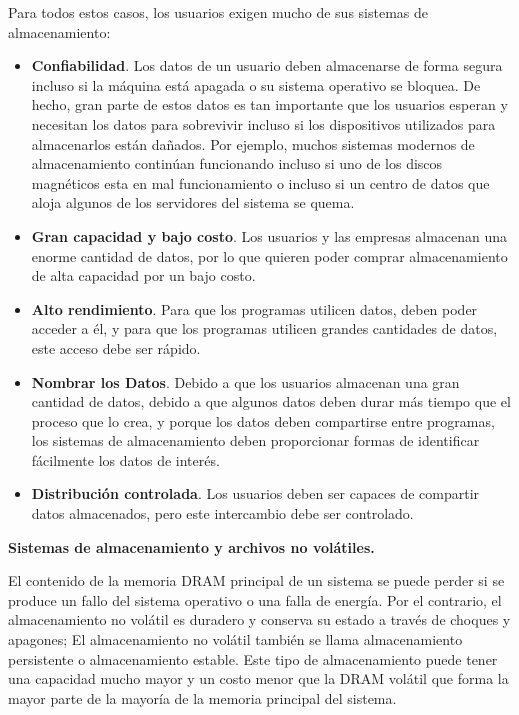 \documentclass[10pt]{book}
\begin{document}
Para todos estos casos, los usuarios exigen mucho de sus sistemas de almacenamiento:
\begin{itemize}
\item \textbf{Confiabilidad}. Los datos de un usuario deben almacenarse de forma segura incluso si la máquina está apagada o su sistema operativo se bloquea. De hecho, gran parte de estos datos es tan importante que los usuarios esperan y necesitan los datos para sobrevivir incluso si los dispositivos utilizados para almacenarlos están dañados. Por ejemplo, muchos sistemas modernos de almacenamiento continúan funcionando incluso si uno de los discos magnéticos esta en mal funcionamiento o incluso si un centro de datos que aloja algunos de los servidores del sistema se quema.

\item \textbf{Gran capacidad y bajo costo}. Los usuarios y las empresas almacenan una enorme cantidad de datos, por lo que quieren poder comprar almacenamiento de alta capacidad por un bajo costo.

\item \textbf{Alto rendimiento}. Para que los programas utilicen datos, deben poder acceder a él, y para que los programas utilicen grandes cantidades de datos, este acceso debe ser rápido.

\item \textbf{Nombrar los Datos}. Debido a que los usuarios almacenan una gran cantidad de datos, debido a que algunos datos deben durar más tiempo que el proceso que lo crea, y porque los datos deben compartirse entre programas, los sistemas de almacenamiento deben proporcionar formas de identificar fácilmente los datos de interés.

\item \textbf{Distribución controlada}. Los usuarios deben ser capaces de compartir datos almacenados, pero este intercambio debe ser controlado.
\end{itemize}

\textbf{Sistemas de almacenamiento y archivos no volátiles.}

El contenido de la memoria DRAM principal de un sistema se puede perder si se produce un fallo del sistema operativo o una falla de energía. Por el contrario, el almacenamiento no volátil es duradero y conserva su estado a través de choques y apagones; El almacenamiento no volátil también se llama almacenamiento persistente o almacenamiento estable. Este tipo de almacenamiento puede tener una capacidad mucho mayor y un costo menor que la DRAM volátil que forma la mayor parte de la mayoría de la memoria principal del sistema.
\end{document}
